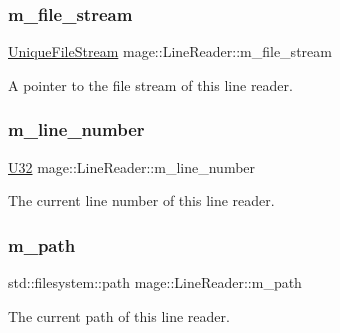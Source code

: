 \subsubsection{\texorpdfstring{m\+\_\+file\+\_\+stream}{m\_file\_stream}}
{\footnotesize\ttfamily \mbox{\hyperlink{namespacemage_a0ee1bd45ad7dbb3dc8c8e1770e3538d4}{Unique\+File\+Stream}} mage\+::\+Line\+Reader\+::m\+\_\+file\+\_\+stream\hspace{0.3cm}{\ttfamily [private]}}

A pointer to the file stream of this line reader. \mbox{\label{classmage_1_1_line_reader_ab145590a7e115106c0987905fde98393}} 
\subsubsection{\texorpdfstring{m\+\_\+line\+\_\+number}{m\_line\_number}}
{\footnotesize\ttfamily \mbox{\hyperlink{namespacemage_a41c104c036fba3756a74e19f793eeaa1}{U32}} mage\+::\+Line\+Reader\+::m\+\_\+line\+\_\+number\hspace{0.3cm}{\ttfamily [private]}}

The current line number of this line reader. \mbox{\label{classmage_1_1_line_reader_a05436c40af16b882c2ebd515287598f7}} 
\subsubsection{\texorpdfstring{m\+\_\+path}{m\_path}}
{\footnotesize\ttfamily std\+::filesystem\+::path mage\+::\+Line\+Reader\+::m\+\_\+path\hspace{0.3cm}{\ttfamily [private]}}

The current path of this line reader. 
